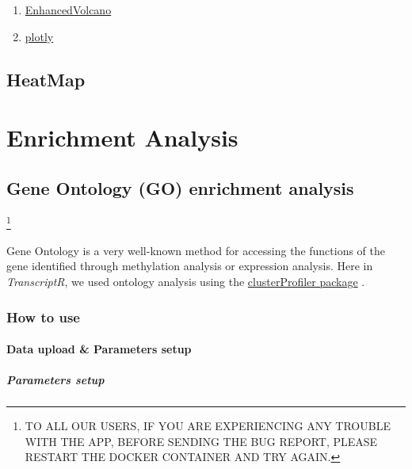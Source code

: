 \documentclass[
  a4paper,
  DIV=11,
  numbers=noendperiod,
  oneside,
  open=any]{scrreport}
\providecommand{\tightlist}{%
  \setlength{\itemsep}{0pt}\setlength{\parskip}{0pt}}\usepackage{longtable,booktabs,array}
\begin{document}
\begin{enumerate}
\def\labelenumi{\arabic{enumi}.}
\tightlist
\item
  \href{}{EnhancedVolcano}
\item
  \href{https://cran.r-project.org/web/packages/plotly/plotly.pdf}{plotly}
\end{enumerate}

\chapter{HeatMap}\label{heatmap}

\part{Enrichment Analysis}

\chapter{Gene Ontology (GO) enrichment analysis}\label{sec-go}

\footnote{TO ALL OUR USERS, IF YOU ARE EXPERIENCING ANY TROUBLE WITH THE
  APP, BEFORE SENDING THE BUG REPORT, PLEASE RESTART THE DOCKER
  CONTAINER AND TRY AGAIN.}

Gene Ontology is a very well-known method for accessing the functions of
the gene identified through methylation analysis or expression analysis.
Here in \emph{TranscriptR}, we used ontology analysis using the
\href{https://bioconductor.org/packages/release/bioc/html/clusterProfiler.html}{clusterProfiler
package} \autocite{yu2012clusterprofiler,wu2021clusterprofiler}.

\section{How to use}\label{how-to-use-4}

\subsection{Data upload \& Parameters
setup}\label{data-upload-parameters-setup}

\subsubsection{Parameters setup}\label{parameters-setup}
\end{document}
